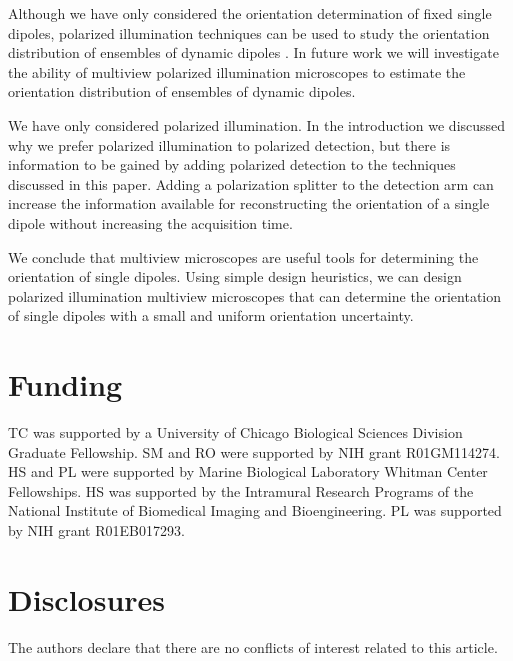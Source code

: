 \documentclass[10pt]{article}
\begin{document}
Although we have only considered the orientation determination of fixed single
dipoles, polarized illumination techniques can be used to study the orientation
distribution of ensembles of dynamic dipoles \cite{mehta2016, backer2016}. In
future work we will investigate the ability of multiview polarized illumination
microscopes to estimate the orientation distribution of ensembles of dynamic
dipoles.

We have only considered polarized illumination. In the introduction
we discussed why we prefer polarized illumination to polarized detection, but
there is information to be gained by adding polarized detection to the
techniques discussed in this paper. Adding a polarization splitter to the
detection arm can increase the information available for reconstructing the
orientation of a single dipole without increasing the acquisition time.

We conclude that multiview microscopes are useful tools for determining the
orientation of single dipoles. Using simple design heuristics, we can design
polarized illumination multiview microscopes that can determine the orientation
of single dipoles with a small and uniform orientation uncertainty.

\section*{Funding}
TC was supported by a University of Chicago Biological Sciences Division
Graduate Fellowship. SM and RO were supported by NIH grant R01GM114274. HS and
PL were supported by Marine Biological Laboratory Whitman Center Fellowships.
HS was supported by the Intramural Research Programs of the National Institute
of Biomedical Imaging and Bioengineering. PL was supported by NIH grant
R01EB017293.

\section*{Disclosures}
The authors declare that there are no conflicts of interest related to this article.
\end{document}

